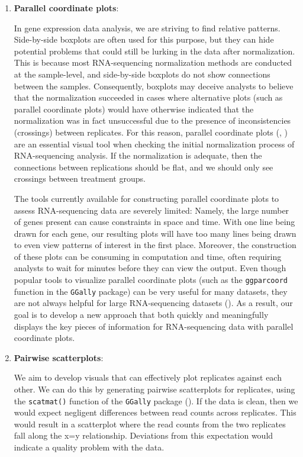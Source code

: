 \documentclass[11pt,a4paper,oldfontcommands,openany]{memoir}
\numberwithin{equation}{section} %
\newcommand{\code}[1]{{\texttt{#1}}}
\begin{document}
\begin{enumerate}
\item \textbf{Parallel coordinate plots}:

In gene expression data analysis, we are striving to find relative patterns. Side-by-side boxplots are often used for this purpose, but they can hide potential problems that could still be lurking in the data after normalization. This is because most RNA-sequencing normalization methods are conducted at the sample-level, and side-by-side boxplots do not show connections between the samples. Consequently, boxplots may deceive analysts to believe that the normalization succeeded in cases where alternative plots (such as parallel coordinate plots) would have otherwise indicated that the normalization was in fact unsuccessful due to the presence of inconsistencies (crossings) between replicates. For this reason, parallel coordinate plots (\citealt{origPCP}, \citealt{origPCP2}) are an essential visual tool when checking the initial normalization process of RNA-sequencing analysis. If the normalization is adequate, then the connections between replications should be flat, and we should only see crossings between treatment groups.

The tools currently available for constructing parallel coordinate plots to assess RNA-sequencing data are severely limited: Namely, the large number of genes present can cause constraints in space and time. With one line being drawn for each gene, our resulting plots will have too many lines being drawn to even view patterns of interest in the first place. Moreover, the construction of these plots can be consuming in computation and time, often requiring analysts to wait for minutes before they can view the output. Even though popular tools to visualize parallel coordinate plots (such as the \code{ggparcoord} function in the \code{GGally} package) can be very useful for many datasets, they are not always helpful for large RNA-sequencing datasets (\citealt{ggally}). As a result, our goal is to develop a new approach that both quickly and meaningfully displays the key pieces of information for RNA-sequencing data with parallel coordinate plots. 

\item \textbf{Pairwise scatterplots}:

We aim to develop visuals that can effectively plot replicates against each other. We can do this by generating pairwise scatterplots for replicates, using the \code{scatmat()} function of the \code{GGally} package (\citealt{ggally}). If the data is clean, then we would expect negligent differences between read counts across replicates. This would result in a scatterplot where the read counts from the two replicates fall along the x=y relationship. Deviations from this expectation would indicate a quality problem with the data.


\end{enumerate}
\end{document}
